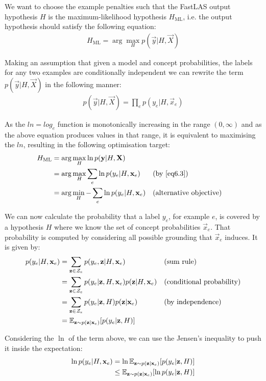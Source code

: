 We want to choose the example penalties such that the FastLAS output hypothesis $H$ is the maximum-likelihood hypothesis $H_{\text{ML}}$, i.e. the output hypothesis should satisfy the following equation:
\begin{align}
H_{\text{ML}} = \arg\max_{H}
p(\vec{y}|H, \vec{X})
\end{align}

Making an assumption that given a model and concept probabilities, the labels for any two examples are conditionally independent we can rewrite the term $p(\vec{y}|H, \vec{X})$ in the following manner:
\begin{align}
p(\vec{y}|H, \vec{X})
= \prod_{e} p(y_e|H, \vec{x}_e) \label{eq6.3}
\end{align}


As the $ln = log_e$ function is monotonically increasing in the range $(0, \infty)$ and as the above equation produces values in that range, it is equivalent to maximising the $ln$, resulting in the following optimisation target:
\begin{align}
H_{\text{ML}}
& = \arg\max_{H}
\ln p(\vec{y}|H, \vec{X}) \nonumber \\
& = \arg\max_{H}
\sum_{e} \ln p(y_e|H, \vec{x}_e) && \text{(by \ref{eq6.3})} \nonumber \\
& = \arg\min_{H}
-\sum_{e} \ln p(y_e|H, \vec{x}_e) && \text{(alternative objective)} \label{ex6.4}
\end{align}


We can now calculate the probability that a label $y_e$, for example $e$, is covered by a hypothesis $H$ where we know the set of concept probabilities $\vec{x}_e$.
That probability is computed by considering all possible grounding that $\vec{x}_e$ induces.
It is given by:
\begin{align}
p(y_e|H, \vec{x}_e)
& = \sum_{\vec{z} \in \curly{Z}_e} p(y_e, \vec{z} | H, \vec{x}_e) && \text{(sum rule)} \nonumber \\
& = \sum_{\vec{z} \in \curly{Z}_e} p(y_e | \vec{z}, H, \vec{x}_e) p(\vec{z} | H, \vec{x}_e) && \text{(conditional probability)} \nonumber \\
& = \sum_{\vec{z} \in \curly{Z}_e} p(y_e | \vec{z}, H) p(\vec{z}| \vec{x}_e) && \text{(by independence)} \nonumber \\
& = \expct_{\vec{z} \sim p(\vec{z}| \vec{x}_e)}[p(y_e|\vec{z},H)] \label{ex6.5}
\end{align}

Considering the $\ln$ of the term above, we can use the Jensen's inequality to push it inside the expectation:
\begin{align}
\ln p(y_e|H, \vec{x}_e)
&= \ln \expct_{\vec{z} \sim p(\vec{z}| \vec{x}_e)}[p(y_e|\vec{z},H)] \nonumber \\
&\leq \expct_{\vec{z} \sim p(\vec{z}| \vec{x}_e)}[\ln  p(y_e|\vec{z},H)] 
\nonumber \\
\end{align}

